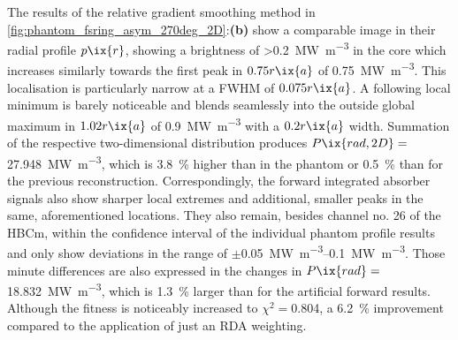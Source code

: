             The results of the relative gradient smoothing method in \cref{fig:phantom_fsring_asym_270deg_2D}:\textbf{(b)} show a comparable image in their radial profile $p\ix{r}$, showing a brightness of >\SI{0.2}{\mega\watt\per\cubic\meter} in the core which increases similarly towards the first peak in $0.75r\ix{a}$ of \SI{0.75}{\mega\watt\per\cubic\meter}. This localisation is particularly narrow at a FWHM of $0.075r\ix{a}$. A following local minimum is barely noticeable and blends seamlessly into the outside global maximum in $1.02r\ix{a}$ of \SI{0.9}{\mega\watt\per\cubic\meter} with a $0.2r\ix{a}$ width. Summation of the respective two-dimensional distribution produces $P\ix{rad,2D}=$\SI{27.948}{\mega\watt\per\cubic\meter}, which is \SI{3.8}{\percent} higher than in the phantom or \SI{0.5}{\percent} than for the previous reconstruction. Correspondingly, the forward integrated absorber signals also show sharper local extremes and additional, smaller peaks in the same, aforementioned locations. They also remain, besides channel no. 26 of the HBCm, within the confidence interval of the individual phantom profile results and only show deviations in the range of $\pm$\SIrange{0.05}{0.1}{\mega\watt\per\cubic\meter}. Those minute differences are also expressed in the changes in $P\ix{rad}=$\SI{18.832}{\mega\watt\per\cubic\meter}, which is \SI{1.3}{\percent} larger than for the artificial forward results. Although the fitness is noticeably increased to $\chi^{2}=$\SI{0.804}{\arbitraryunit}, a \SI{6.2}{\percent} improvement compared to the application of just an RDA weighting.\\%
